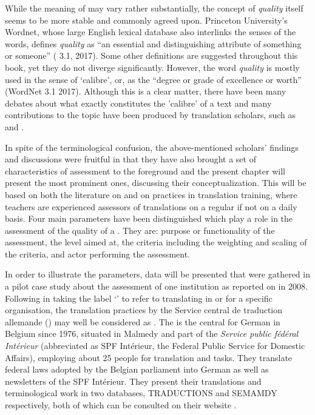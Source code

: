 \documentclass[output=paper]{langsci/langscibook}
\begin{document}
While the meaning of  may vary rather substantially, the concept of \textit{quality} itself seems to be more stable and commonly agreed upon. Princeton University's Wordnet, whose large English lexical database also interlinks the senses of the words, defines \textit{quality} as ``an essential and distinguishing attribute of something or someone'' (\citeauthor{WordNet2010} 3.1, 2017). Some other definitions are suggested throughout this book, yet they do not diverge significantly. However, the word \textit{quality} is mostly used in the sense of `calibre', or, as the ``degree or grade of excellence or worth'' (WordNet 3.1 2017). Although this is a clear matter, there have been many debates about what exactly constitutes the 'calibre' of a text and many contributions to the topic have been produced by translation scholars, such as \citet{Lauscher2000,Maier2000,Lee-Jahnke2001,Colina2009,VanPoel2007} and \citet{Depraetere2011}. 

In spite of the terminological confusion, the above-mentioned scholars' findings and discussions were fruitful in that they have also brought a set of characteristics of  assessment to the foreground and the present chapter will present the most prominent ones, discussing their conceptualization. This will be based on both the literature on  and on  practices in translation training, where teachers are experienced assessors of translations on a regular if not on a daily basis. Four main parameters have been distinguished which play a role in the assessment of the quality of a . They are: purpose or functionality of the  assessment, the  level aimed at, the criteria including the weighting and scaling of the criteria, and actor performing the assessment. 

In order to illustrate the parameters, data will be presented that were gathered in a pilot case study about the  assessment of one institution as reported on in 2008. Following \citet[493–494]{Schäffner2014} in taking the label ‘’ to refer to translating in or for a specific organisation, the translation practices by the Service central de traduction allemande (\citeauthor{SCTAn.d.}) may well be considered as . The \citeauthor{SCTA2015} is the central  for German in Belgium since 1976, situated in Malmedy and part of the \textit{Service public fédéral Intérieur} (abbreviated as SPF Intérieur, the Federal Public Service for Domestic Affairs), employing about 25 people for translation and  tasks. They translate federal laws adopted by the Belgian parliament into German as well as newsletters of the SPF Intérieur. They present their translations and terminological work in two databases, TRADUCTIONS and SEMAMDY respectively, both of which can be consulted on their website \citep{SCTAn.d.}.
\end{document}
